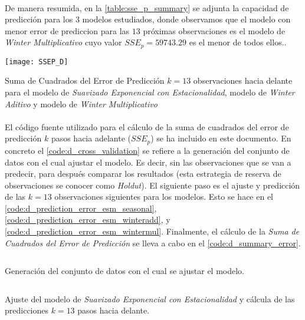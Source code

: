 \documentclass[a4paper, spanish]{article}
\begin{document}
    \paragraph{}
    De manera resumida, en la \autoref{table:sse_p_summary} se adjunta la capacidad de predicción para los $3$ modelos estudiados, donde observamos que el modelo con menor error de prediccion para las $13$ próximas observaciones es el modelo de \emph{Winter Multiplicativo} cuyo valor $SSE_p = 59743.29$ es el menor de todos ellos..

    \begin{table}[htb!]
      \centering
      \texttt{[image: SSEP\_D]}
      \caption{Suma de Cuadrados del Error de Predicción $k =13$ observaciones hacia delante para el modelo de \emph{Suavizado Exponencial con Estacionalidad}, modelo de \emph{Winter Aditivo} y modelo de \emph{Winter Multiplicativo}}
      \label{table:sse_p_summary}
    \end{table}

    \paragraph{}
    El código fuente utilizado para el cálculo de la suma de cuadrados del error de predicción $k$ pasos hacia adelante ($SSE_p$) se ha incluido en este documento. En concreto el \autoref{code:d_cross_validation} se refiere a la generación del conjunto de datos con el cual ajustar el modelo. Es decir, sin las observaciones que se van a predecir, para después comparar los resultados (esta estrategia de reserva de observaciones se conocer como \emph{Holdut}). El siguiente paso es el ajuste y predicción de las $k = 13$ observaciones siguientes para los modelos. Esto se hace en el \autoref{code:d_prediction_error_esm_seasonal}, \autoref{code:d_prediction_error_esm_winteradd}, y \autoref{code:d_prediction_error_esm_wintermul}. Finalmente, el cálculo de la \emph{Suma de Cuadrados del Error de Predicción} se lleva a cabo en el \autoref{code:d_summary_error}.

    \begin{listing}[htb!]
      \centering
      \inputminted{SAS}{./res/code/d-01-cross-validation.sas}
      \caption{Generación del conjunto de datos con el cual se ajustar el modelo.}
      \label{code:d_cross_validation}
    \end{listing}

    \begin{listing}[htb!]
      \centering
      \inputminted{SAS}{./res/code/d-02-prediction-error-esm-seasonal.sas}
      \caption{Ajuste del modelo de \emph{Suavizado Exponencial con Estacionalidad} y cálcula de las predicciones $k = 13$ pasos hacia delante.}
      \label{code:d_prediction_error_esm_seasonal}
    \end{listing}
\end{document}
